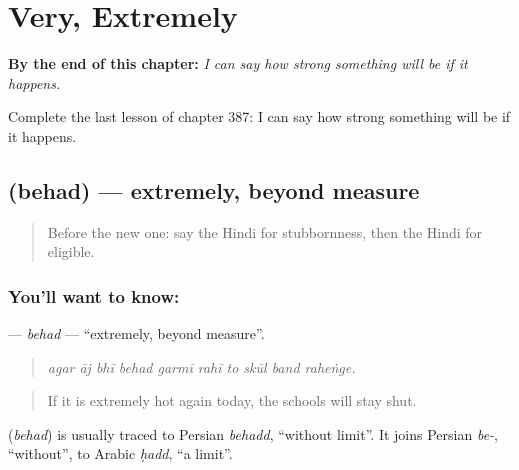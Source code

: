 
\chapter{Very, Extremely}
\label{ch:hi-very-extremely}

\begin{chapteropening}
\textbf{By the end of this chapter:} \emph{I can say how strong something will be if it happens.}

Complete the last lesson of chapter 387: I can say how strong something will be if it happens.
\end{chapteropening}

\section[\texorpdfstring{\hi{बेहद} (behad)}{बेहद (behad)}]{ (behad) — extremely, beyond measure}

\label{lesson:HI-C387-behad}



\begin{quote}
Before the new one: say the Hindi for stubbornness, then the Hindi for eligible.
\end{quote}

\subsection*{You'll want to know: }
\textbf{} — \emph{behad} — \textquotedblleft{}extremely, beyond measure\textquotedblright{}.

\begin{quote}
         
\end{quote}

\begin{quote}
\emph{agar āj bhī behad garmī rahī to skūl band raheṅge.}
\end{quote}

\begin{quote}
If it is extremely hot again today, the schools will stay shut.
\end{quote}

\begin{cousinweb}
\textbf{} (\emph{behad}) is usually traced to Persian \emph{behadd}, \textquotedblleft{}without limit\textquotedblright{}. It joins Persian \emph{be-}, \textquotedblleft{}without\textquotedblright{}, to Arabic \emph{ḥadd}, \textquotedblleft{}a limit\textquotedblright{}.
\end{cousinweb}

